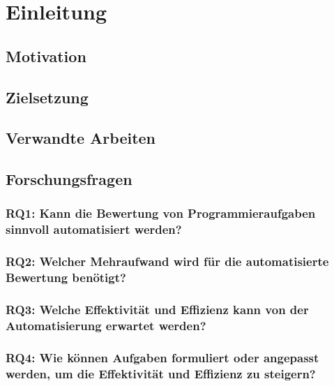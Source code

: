 \chapter{Einleitung}\label{ch:introduction}

\section{Motivation}\label{sec:motivation}

\section{Zielsetzung}\label{sec:zielsetzung}

\section{Verwandte Arbeiten}\label{sec:verwandte-arbeiten}

\section{Forschungsfragen}\label{sec:forschungsfragen}

\subsection[RQ1]{RQ1: Kann die Bewertung von Programmieraufgaben sinnvoll automatisiert werden?}\label{subsec:rq1-useful-automation}

\subsection[RQ2]{RQ2: Welcher Mehraufwand wird für die automatisierte Bewertung benötigt?}\label{subsec:rq2-additional-effort}


\subsection[RQ3]{RQ3: Welche Effektivität und Effizienz kann von der Automatisierung erwartet werden?}\label{subsec:rq3-effectivity-efficiency}


\subsection[RQ4]{RQ4: Wie können Aufgaben formuliert oder angepasst werden, um die Effektivität und Effizienz zu steigern?}\label{subsec:rq4-improve-effectivity-efficiency}

